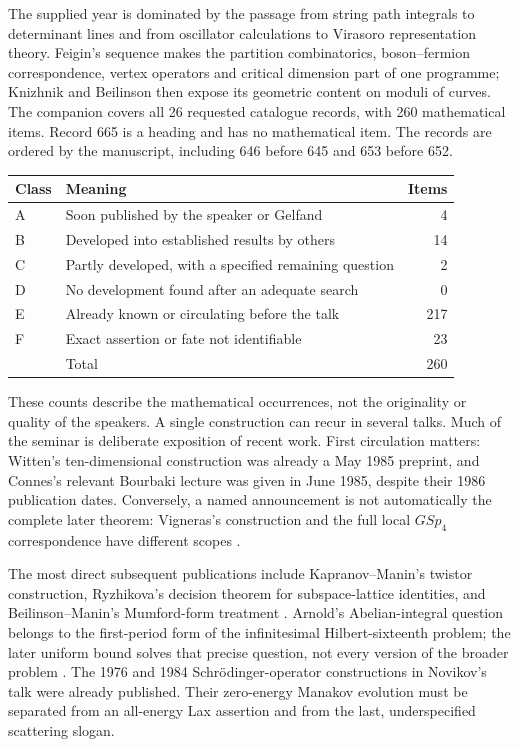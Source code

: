 The supplied year is dominated by the passage from string path integrals to
determinant lines and from oscillator calculations to Virasoro representation
theory. Feigin's sequence makes the partition combinatorics, boson--fermion
correspondence, vertex operators and critical dimension part of one programme;
Knizhnik and Beilinson then expose its geometric content on moduli of curves.
The companion covers all 26 requested catalogue records, with 260 mathematical
items. Record 665 is a heading and has no mathematical item. The records are
ordered by the manuscript, including 646 before 645 and 653 before 652.

\begin{center}
\begin{tabular}{@{}llr@{}}
\toprule
Class & Meaning & Items\\
\midrule
A & Soon published by the speaker or Gelfand & 4\\
B & Developed into established results by others & 14\\
C & Partly developed, with a specified remaining question & 2\\
D & No development found after an adequate search & 0\\
E & Already known or circulating before the talk & 217\\
F & Exact assertion or fate not identifiable & 23\\
\midrule
 & Total & 260\\
\bottomrule
\end{tabular}
\end{center}

These counts describe the mathematical occurrences, not the originality or
quality of the speakers. A single construction can recur in several talks.
Much of the seminar is deliberate exposition of recent work. First circulation
matters: Witten's ten-dimensional construction was already a May 1985 preprint,
and Connes's relevant Bourbaki lecture was given in June 1985, despite their
1986 publication dates. Conversely, a named announcement is not automatically
the complete later theorem: Vigneras's construction and the full local
\(GSp_4\) correspondence have different scopes
\citep[\S11 and Main Theorem]{gantakeda2011local}.

The most direct subsequent publications include Kapranov--Manin's twistor
construction, Ryzhikova's decision theorem for subspace-lattice identities,
and Beilinson--Manin's Mumford-form treatment
\citep[\S3]{kapranovmanin1986twistor}
\citep{ryzhikova1987decidability,beilinsonmanin1986mumford}.
Arnold's Abelian-integral question belongs to the first-period form of the
infinitesimal Hilbert-sixteenth problem; the later uniform bound solves that
precise question, not every version of the broader problem
\citep[Theorem~2]{binyamininovikovyakovenko2010zeros}.
The 1976 and 1984 Schrödinger-operator constructions in Novikov's talk were
already published. Their zero-energy Manakov evolution must be separated from
an all-energy Lax assertion and from the last, underspecified scattering slogan.

